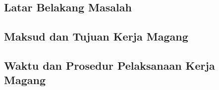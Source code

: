 \chapter{\babSatu}

\lipsum[1-1]

\section{Latar Belakang Masalah}
\lipsum[2-3]



\section{Maksud dan Tujuan Kerja Magang}



\section{Waktu dan Prosedur Pelaksanaan Kerja Magang}



